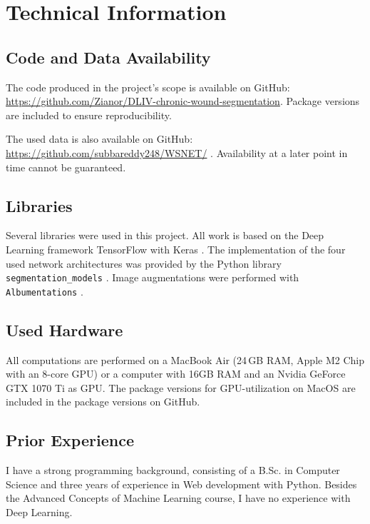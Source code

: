 \section{Technical Information}

\subsection{Code and Data Availability}

The code produced in the project's scope is available on GitHub: \url{https://github.com/Zianor/DLIV-chronic-wound-segmentation}. Package versions are included to ensure reproducibility.

The used data is also available on GitHub: \url{https://github.com/subbareddy248/WSNET/} \cite{Oota_2021_WACV, Oota_2023_WACV}. Availability at a later point in time cannot be guaranteed.

\subsection{Libraries}

Several libraries were used in this project. All work is based on the Deep Learning framework TensorFlow with Keras \cite{tensorflow2015-whitepaper, chollet2015keras}. The implementation of the four used network architectures was provided by the Python library \texttt{segmentation\_models} \cite{SegmentationModels}. Image augmentations were performed with \texttt{Albumentations} \cite{albumentations}.

\subsection{Used Hardware}

All computations are performed on a MacBook Air (24\,GB RAM, Apple M2 Chip with an 8-core GPU) or a computer with 16GB RAM and an Nvidia GeForce GTX 1070 Ti as GPU. The package versions for GPU-utilization on MacOS are included in the package versions on GitHub.

\subsection{Prior Experience}

I have a strong programming background, consisting of a B.Sc. in Computer Science and three years of experience in Web development with Python. Besides the Advanced Concepts of Machine Learning course, I have no experience with Deep Learning.

